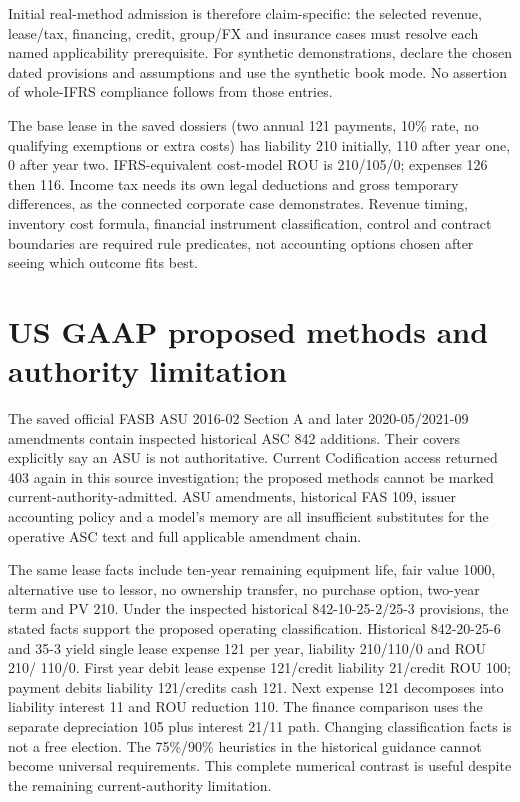 Initial real-method admission is therefore claim-specific: the selected revenue, lease/tax, financing, credit, group/FX and insurance cases must resolve each named applicability prerequisite. For synthetic demonstrations, declare the chosen dated provisions and assumptions and use the synthetic book mode. No assertion of whole-IFRS compliance follows from those entries.

The base lease in the saved dossiers (two annual 121 payments, 10\% rate, no qualifying exemptions or extra costs) has liability 210 initially, 110 after year one, 0 after year two. IFRS-equivalent cost-model ROU is 210/105/0; expenses 126 then 116. Income tax needs its own legal deductions and gross temporary differences, as the connected corporate case demonstrates. Revenue timing, inventory cost formula, financial instrument classification, control and contract boundaries are required rule predicates, not accounting options chosen after seeing which outcome fits best.

\hypertarget{us-gaap-proposed-methods-and-authority-limitation}{%
\section{US GAAP proposed methods and authority limitation}\label{method-standards-methods-us-gaap-proposed-methods-and-authority-limitation}}

The saved official FASB ASU 2016-02 Section A and later 2020-05/2021-09 amendments contain inspected historical ASC 842 additions. Their covers explicitly say an ASU is not authoritative. Current Codification access returned 403 again in this source investigation; the proposed methods cannot be marked current-authority-admitted. ASU amendments, historical FAS 109, issuer accounting policy and a model's memory are all insufficient substitutes for the operative ASC text and full applicable amendment chain. 

The same lease facts include ten-year remaining equipment life, fair value 1000, alternative use to lessor, no ownership transfer, no purchase option, two-year term and PV 210. Under the inspected historical 842-10-25-2/25-3 provisions, the stated facts support the proposed operating classification. Historical 842-20-25-6 and 35-3 yield single lease expense 121 per year, liability 210/110/0 and ROU 210/ 110/0. First year debit lease expense 121/credit liability 21/credit ROU 100; payment debits liability 121/credits cash 121. Next expense 121 decomposes into liability interest 11 and ROU reduction 110. The finance comparison uses the separate depreciation 105 plus interest 21/11 path. Changing classification facts is not a free election. The 75\%/90\% heuristics in the historical guidance cannot become universal requirements. This complete numerical contrast is useful despite the remaining current-authority limitation.


